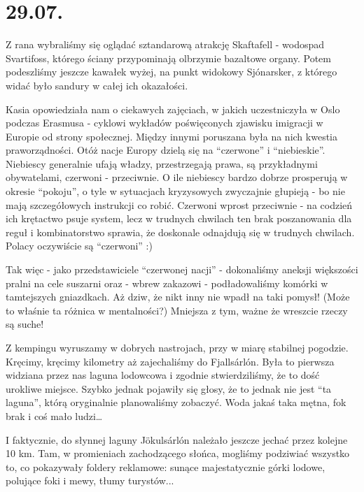 \chapter{29.07.}

Z rana wybraliśmy się oglądać sztandarową atrakcję Skaftafell - wodospad Svartifoss, którego ściany przypominają olbrzymie bazaltowe organy. Potem podeszliśmy jeszcze kawałek wyżej, na punkt widokowy Sjónarsker, z którego widać było sandury w całej ich okazałości.

Kasia opowiedziała nam o ciekawych zajęciach, w jakich uczestniczyła w Oslo podczas Erasmusa - cyklowi wykładów poświęconych zjawisku imigracji w Europie od strony społecznej. Między innymi poruszana była na nich kwestia praworządności. Otóż nacje Europy dzielą się na “czerwone” i “niebieskie”. Niebiescy generalnie ufają władzy, przestrzegają prawa, są przykładnymi obywatelami, czerwoni - przeciwnie. O ile niebiescy bardzo dobrze prosperują w okresie “pokoju”, o tyle w sytuacjach kryzysowych zwyczajnie głupieją - bo nie mają szczegółowych instrukcji co robić. Czerwoni wprost przeciwnie - na codzień ich krętactwo psuje system, lecz w trudnych chwilach ten brak poszanowania dla reguł i kombinatorstwo sprawia, że doskonale odnajdują się w trudnych chwilach. Polacy oczywiście są “czerwoni” :)

Tak więc - jako przedstawiciele “czerwonej nacji” - dokonaliśmy aneksji większości pralni na cele suszarni oraz - wbrew zakazowi - podładowaliśmy komórki w tamtejszych gniazdkach. Aż dziw, że nikt inny nie wpadł na taki pomysł! (Może to właśnie ta różnica w mentalności?) Mniejsza z tym, ważne że wreszcie rzeczy są suche!


Z kempingu wyruszamy w dobrych nastrojach, przy w miarę stabilnej pogodzie. Kręcimy, kręcimy kilometry aż zajechaliśmy do Fjallsárlón. Była to pierwsza widziana przez nas laguna lodowcowa i zgodnie stwierdziliśmy, że to dość urokliwe miejsce. Szybko jednak pojawiły się głosy, że to jednak nie jest “ta laguna”, którą oryginalnie planowaliśmy zobaczyć. Woda jakaś taka mętna, fok brak i coś mało ludzi…


I faktycznie, do słynnej laguny Jökulsárlón należało jeszcze jechać przez kolejne 10 km. Tam, w promieniach zachodzącego słońca, mogliśmy podziwiać wszystko to, co pokazywały foldery reklamowe: sunące majestatycznie górki lodowe, polujące foki i mewy, tłumy turystów...

